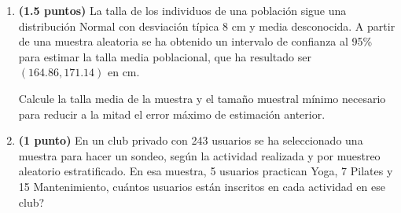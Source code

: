 
\begin{enumerate}[label=\alph*)]
\item \textbf{(1.5 puntos)} La talla de los individuos de una población sigue una distribución Normal con desviación típica 8 cm y media desconocida. A partir de una muestra aleatoria se ha obtenido un intervalo de confianza al 95\% para estimar la talla media poblacional, que ha resultado ser $(164.86,171.14)$ en cm.

Calcule la talla media de la muestra y el tamaño muestral mínimo necesario para reducir a la mitad el error máximo de estimación anterior.
\item \textbf{(1 punto)} En un club privado con 243 usuarios se ha seleccionado una muestra para hacer un sondeo, según la actividad realizada y por muestreo aleatorio estratificado. En esa muestra, 5 usuarios practican Yoga, 7 Pilates y 15 Mantenimiento, \textquestiondown{}cuántos usuarios están inscritos en cada actividad en ese club?
\end{enumerate}
